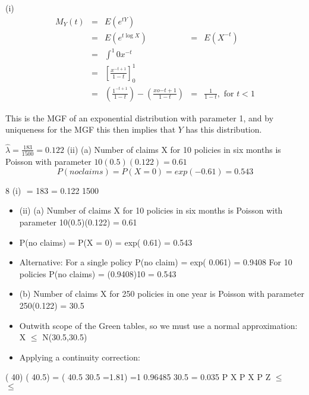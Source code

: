 \documentclass[a4paper,12pt]{article}
\begin{document}
(i)
\begin{eqnarray*}
M_Y( t ) &=& E ( e^{tY} ) \\ 
&=& E ( e^{t\log X} )
&=& E(X^{-t}) \\
&=& \int^{1}{0} x^{-t}\\
&=& \left[ \frac{x^{-t+1}}{1-t}\right]^{1}_{0} \\
&=& \left(  \frac{1^{-t+1}}{1-t}\right) - \left( \frac{xo{-t+1}}{1-t}\right)
&=& \frac{1}{1-t}, \mbox{ for } t < 1
\end{eqnarray*}

This is the MGF of an exponential distribution with parameter 1, and by
uniqueness for the MGF this then implies that $Y$ has this distribution.




$ \hat{\lambda} = \frac{183}{1500} = 0.122$
(ii) (a)
Number of claims X for 10 policies in six months is Poisson with
parameter $10(0.5)(0.122) = 0.61$
\[P(no claims) = P(X = 0) = exp(-0.61) = 0.543\]


8 (i)  = 183 = 0.122
1500

\begin{itemize}
    \item (ii) (a) Number of claims X for 10 policies in six months is Poisson with
parameter 10(0.5)(0.122) = 0.61
\item P(no claims) = P(X = 0) = exp(	0.61) = 0.543
\item Alternative:
For a single policy P(no claim) = exp(	0.061) = 0.9408
For 10 policies P(no claims) = (0.9408)10 = 0.543
\item (b) Number of claims X for 250 policies in one year is Poisson with
parameter 250(0.122) = 30.5
\item Outwith scope of the Green tables, so we must use a normal
approximation:
X $\leq$ N(30.5,30.5)
\item Applying a continuity correction:
\end{itemize}

( 40) ( 40.5) = ( 40.5 30.5 =1.81) =1 0.96485
30.5
= 0.035
P X P X P Z $\leq$
    $\leq$
\end{document}
